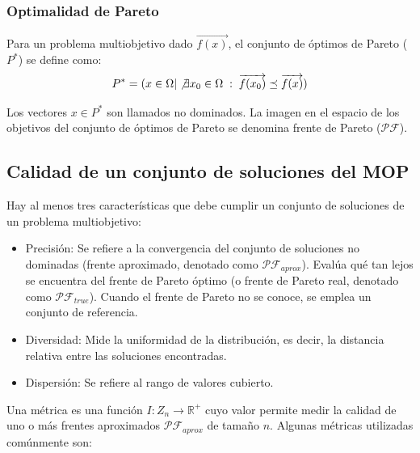 \documentclass[letterpaper,10pt]{article}
\begin{document}
\subsubsection{Optimalidad de Pareto}

Para un problema multiobjetivo dado $\overrightarrow{f(x)}$, el conjunto de óptimos de Pareto ($P^*$) se define como:
$$P^* = ( x \in \Omega | \not\exists x_0 \in \Omega \; : \; \overrightarrow{f(x_0)} \preceq \overrightarrow{f(x)})$$
 
Los vectores $x \in P^*$ son llamados no dominados. La imagen en el espacio de los objetivos del conjunto de óptimos de Pareto se denomina frente de Pareto ($\mathcal{PF}$).
 
 
\subsection{Calidad de un conjunto de soluciones del MOP}
 
Hay al menos tres características que debe cumplir un conjunto de soluciones de un problema multiobjetivo:

\begin{itemize}
 \item Precisión: Se refiere a la convergencia del conjunto de soluciones no dominadas (frente aproximado, denotado como $\mathcal{PF}_{aprox}$). Evalúa qué tan lejos se encuentra del
frente de Pareto óptimo (o frente de Pareto real, denotado como $\mathcal{PF}_{true}$). Cuando el frente de Pareto no se conoce, se emplea un conjunto de referencia.

 \item Diversidad: Mide la uniformidad de la distribución, es decir, la distancia relativa entre las soluciones encontradas.

 \item Dispersión: Se refiere al rango de valores cubierto.
 
\end{itemize}

Una métrica es una función $I:Z_n \rightarrow \mathbb{R}^+$ cuyo valor permite medir la calidad de uno o más frentes aproximados $\mathcal{PF}_{aprox}$ de tamaño $n$. Algunas métricas utilizadas comúnmente son:
\end{document}
